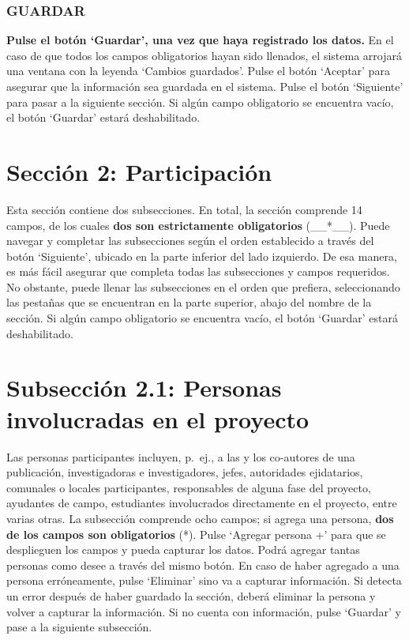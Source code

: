 \documentclass[
]{book}
\begin{document}
\hypertarget{guardar}{%
\subsection{GUARDAR}\label{guardar}}

\textbf{Pulse el botón `Guardar', una vez que haya registrado los datos.} En el caso de que todos los campos obligatorios hayan sido llenados, el sistema arrojará una ventana con la leyenda `Cambios guardados'.
Pulse el botón `Aceptar' para asegurar que la información sea guardada en el sistema.
Pulse el botón `Siguiente' para pasar a la siguiente sección.
Si algún campo obligatorio se encuentra vacío, el botón `Guardar' estará deshabilitado.

\hypertarget{secciuxf3n-2-participaciuxf3n}{%
\chapter*{Sección 2: Participación}\label{secciuxf3n-2-participaciuxf3n}}

Esta sección contiene dos subsecciones.
En total, la sección comprende 14 campos, de los cuales \textbf{dos son estrictamente obligatorios} (\_\_*\_\_).
Puede navegar y completar las subsecciones según el orden establecido a través del botón `Siguiente', ubicado en la parte inferior del lado izquierdo.
De esa manera, es más fácil asegurar que completa todas las subsecciones y campos requeridos.
No obstante, puede llenar las subsecciones en el orden que prefiera, seleccionando las pestañas que se encuentran en la parte superior, abajo del nombre de la sección.
Si algún campo obligatorio se encuentra vacío, el botón `Guardar' estará deshabilitado.

\hypertarget{subsecciuxf3n-2.1-personas-involucradas-en-el-proyecto}{%
\chapter*{Subsección 2.1: Personas involucradas en el proyecto}\label{subsecciuxf3n-2.1-personas-involucradas-en-el-proyecto}}

Las personas participantes incluyen, p.~ej., a las y los co-autores de una publicación, investigadoras e investigadores, jefes, autoridades ejidatarios, comunales o locales participantes, responsables de alguna fase del proyecto, ayudantes de campo, estudiantes involucrados directamente en el proyecto, entre varias otras.
La subsección comprende ocho campos; si agrega una persona, \textbf{dos de los campos son obligatorios} (*).
Pulse `Agregar persona +' para que se desplieguen los campos y pueda capturar los datos.
Podrá agregar tantas personas como desee a través del mismo botón.
En caso de haber agregado a una persona erróneamente, pulse `Eliminar' sino va a capturar información.
Si detecta un error después de haber guardado la sección, deberá eliminar la persona y volver a capturar la información.
Si no cuenta con información, pulse `Guardar' y pase a la siguiente subsección.
\end{document}
